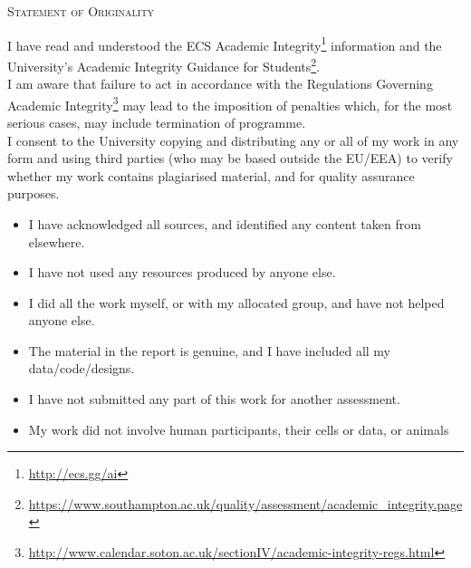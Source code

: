 \documentclass[12pt]{report}
\begin{document}


\newpage


\begin{center}
    \textsc{\LARGE Statement of Originality} \\ [1cm]
\end{center}
I have read and understood the ECS Academic Integrity\footnote{\url{http://ecs.gg/ai}} information and the University’s
Academic Integrity Guidance for Students\footnote{\url{https://www.southampton.ac.uk/quality/assessment/academic\_integrity.page}}.
\\[0.3cm]
I am aware that failure to act in accordance with the Regulations Governing Academic Integrity\footnote{\url{http://www.calendar.soton.ac.uk/sectionIV/academic-integrity-regs.html}}
may lead to the imposition of penalties which, for the most serious cases, may include
termination of programme.
\\[0.3cm]
I consent to the University copying and distributing any or all of my work in any form and
using third parties (who may be based outside the EU/EEA) to verify whether my work
contains plagiarised material, and for quality assurance purposes.
\\[0.5cm]

\begin{itemize}
    \item I have acknowledged all sources, and identified any content taken from elsewhere.
    \item I have not used any resources produced by anyone else.
    \item I did all the work myself, or with my allocated group, and have not helped anyone else.
    \item The material in the report is genuine, and I have included all my data/code/designs.
    \item I have not submitted any part of this work for another assessment.
    \item My work did not involve human participants, their cells or data, or animals
\end{itemize}

\newpage
\end{document}
